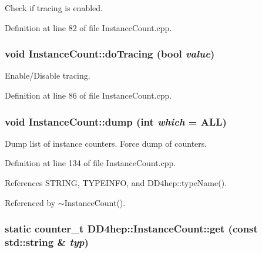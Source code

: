 Check if tracing is enabled. 

Definition at line 82 of file InstanceCount.cpp.\hypertarget{struct_d_d4hep_1_1_instance_count_a12dd0a7dd1f4a64ef784dec2eda4b96a}{
\subsubsection[{doTracing}]{\setlength{\rightskip}{0pt plus 5cm}void InstanceCount::doTracing (bool {\em value})}}
\label{struct_d_d4hep_1_1_instance_count_a12dd0a7dd1f4a64ef784dec2eda4b96a}


Enable/Disable tracing. 

Definition at line 86 of file InstanceCount.cpp.\hypertarget{struct_d_d4hep_1_1_instance_count_ae9cc6db5c9117d6451a3d817c55af8c1}{
\subsubsection[{dump}]{\setlength{\rightskip}{0pt plus 5cm}void InstanceCount::dump (int {\em which} = {\ttfamily ALL})}}
\label{struct_d_d4hep_1_1_instance_count_ae9cc6db5c9117d6451a3d817c55af8c1}


Dump list of instance counters. Force dump of counters. 

Definition at line 134 of file InstanceCount.cpp.

References STRING, TYPEINFO, and DD4hep::typeName().

Referenced by $\sim$InstanceCount().\hypertarget{struct_d_d4hep_1_1_instance_count_aecb1277df454b018fc8144635c3dcb24}{
\subsubsection[{get}]{\setlength{\rightskip}{0pt plus 5cm}static {\bf counter\_\-t} DD4hep::InstanceCount::get (const std::string \& {\em typ})}}
\label{struct_d_d4hep_1_1_instance_count_aecb1277df454b018fc8144635c3dcb24}


